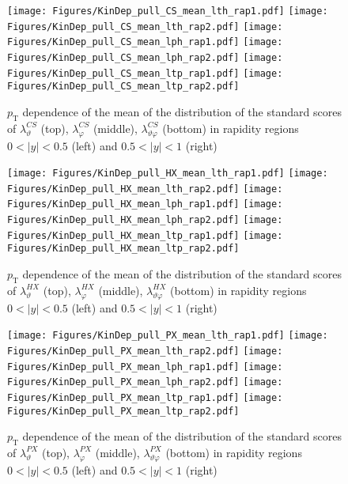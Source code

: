 \documentclass[12pt]{article}
\newcommand{\pT}{p_\mathrm{T}}
\newcommand{\absy}{\left |  y \right |}
\newcommand{\lamthCS}{\lambda^{\scriptscriptstyle CS}_\vartheta}
\newcommand{\lamphCS}{\lambda^{\scriptscriptstyle CS}_\varphi}
\newcommand{\lamthphCS}{\lambda^{\scriptscriptstyle CS}_{\vartheta \varphi}}
\newcommand{\lamthHX}{\lambda^{\scriptscriptstyle HX}_\vartheta}
\newcommand{\lamphHX}{\lambda^{\scriptscriptstyle HX}_\varphi}
\newcommand{\lamthphHX}{\lambda^{\scriptscriptstyle HX}_{\vartheta \varphi}}
\newcommand{\lamthPX}{\lambda^{\scriptscriptstyle PX}_\vartheta}
\newcommand{\lamphPX}{\lambda^{\scriptscriptstyle PX}_\varphi}
\newcommand{\lamthphPX}{\lambda^{\scriptscriptstyle PX}_{\vartheta \varphi}}
\begin{document}


\begin{figure}[htbp]
\centering
\texttt{[image: Figures/KinDep\_pull\_CS\_mean\_lth\_rap1.pdf]}
\texttt{[image: Figures/KinDep\_pull\_CS\_mean\_lth\_rap2.pdf]}
\texttt{[image: Figures/KinDep\_pull\_CS\_mean\_lph\_rap1.pdf]}
\texttt{[image: Figures/KinDep\_pull\_CS\_mean\_lph\_rap2.pdf]}
\texttt{[image: Figures/KinDep\_pull\_CS\_mean\_ltp\_rap1.pdf]}
\texttt{[image: Figures/KinDep\_pull\_CS\_mean\_ltp\_rap2.pdf]}
\caption{$\pT$ dependence of the mean of the distribution of the standard scores
of $\lamthCS$ (top), $\lamphCS$ (middle), $\lamthphCS$ (bottom) in rapidity
regions $0<\absy<0.5$ (left) and $0.5<\absy<1$ (right)}
\end{figure}
\clearpage

\begin{figure}[htbp]
\centering
\texttt{[image: Figures/KinDep\_pull\_HX\_mean\_lth\_rap1.pdf]}
\texttt{[image: Figures/KinDep\_pull\_HX\_mean\_lth\_rap2.pdf]}
\texttt{[image: Figures/KinDep\_pull\_HX\_mean\_lph\_rap1.pdf]}
\texttt{[image: Figures/KinDep\_pull\_HX\_mean\_lph\_rap2.pdf]}
\texttt{[image: Figures/KinDep\_pull\_HX\_mean\_ltp\_rap1.pdf]}
\texttt{[image: Figures/KinDep\_pull\_HX\_mean\_ltp\_rap2.pdf]}
\caption{$\pT$ dependence of the mean of the distribution of the standard scores
of $\lamthHX$ (top), $\lamphHX$ (middle), $\lamthphHX$ (bottom) in rapidity
regions $0<\absy<0.5$ (left) and $0.5<\absy<1$ (right)}
\end{figure}
\clearpage

\begin{figure}[htbp]
\centering
\texttt{[image: Figures/KinDep\_pull\_PX\_mean\_lth\_rap1.pdf]}
\texttt{[image: Figures/KinDep\_pull\_PX\_mean\_lth\_rap2.pdf]}
\texttt{[image: Figures/KinDep\_pull\_PX\_mean\_lph\_rap1.pdf]}
\texttt{[image: Figures/KinDep\_pull\_PX\_mean\_lph\_rap2.pdf]}
\texttt{[image: Figures/KinDep\_pull\_PX\_mean\_ltp\_rap1.pdf]}
\texttt{[image: Figures/KinDep\_pull\_PX\_mean\_ltp\_rap2.pdf]}
\caption{$\pT$ dependence of the mean of the distribution of the standard scores
of $\lamthPX$ (top), $\lamphPX$ (middle), $\lamthphPX$ (bottom) in rapidity
regions $0<\absy<0.5$ (left) and $0.5<\absy<1$ (right)}
\end{figure}
\clearpage
\end{document}

